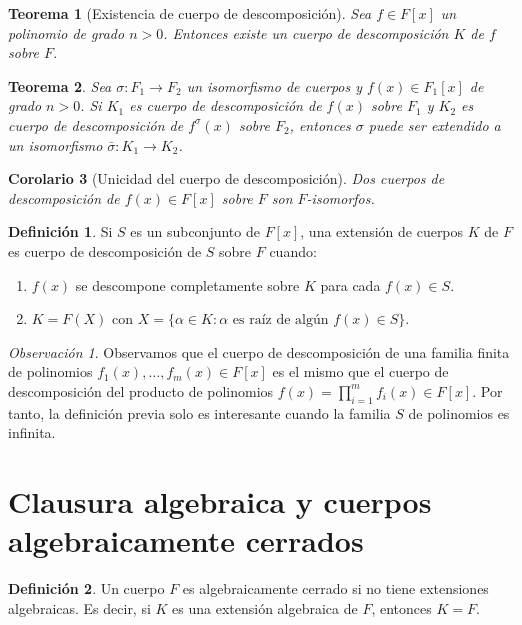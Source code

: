 \documentclass{report}
\newtheorem{theorem}{Teorema}[chapter]
\newtheorem{corollary}[theorem]{Corolario}
\theoremstyle{remark}
\newtheorem*{remark}{Observación}
\theoremstyle{definition}
\newtheorem{definition}{Definición}[chapter]
\theoremstyle{definition}
\theoremstyle{definition}
\begin{document}
\begin{theorem}[Existencia de cuerpo de descomposición]
    Sea $f \in F[x]$ un polinomio de grado $n > 0$.
    Entonces existe un cuerpo de descomposición $K$ de $f$ sobre $F$.
\end{theorem}

\begin{theorem}
    Sea $\sigma : F_1 \to F_2$ un isomorfismo de cuerpos y $f(x) \in F_1[x]$ de grado $n > 0$.
    Si $K_1$ es cuerpo de descomposición de $f(x)$ sobre $F_1$ y $K_2$ es cuerpo de descomposición de $f^\sigma(x)$ sobre $F_2$, entonces $\sigma$ puede ser extendido a un isomorfismo $\bar{\sigma} : K_1 \to K_2$.
\end{theorem}

\begin{corollary}[Unicidad del cuerpo de descomposición]
    Dos cuerpos de descomposición de $f(x) \in F[x]$ sobre $F$ son $F$-isomorfos.
\end{corollary}

\begin{definition}
    Si $S$ es un subconjunto de $F[x]$, una extensión de cuerpos $K$ de $F$ es cuerpo de descomposición de $S$ sobre $F$ cuando:
    \begin{enumerate}
        \item $f(x)$ se descompone completamente sobre $K$ para cada $f(x) \in S$.
        \item $K = F(X)$ con $X = \{ \alpha \in K : \alpha \text{ es raíz de algún } f(x) \in S \}$.
    \end{enumerate}
\end{definition}

\begin{remark}
    Observamos que el cuerpo de descomposición de una familia finita de polinomios $f_1(x), \dots, f_m(x) \in F[x]$ es el mismo que el cuerpo de descomposición del producto de polinomios $f(x) = \prod_{i = 1}^m f_i(x) \in F[x]$.
    Por tanto, la definición previa solo es interesante cuando la familia $S$ de polinomios es infinita.
\end{remark}

\section{Clausura algebraica y cuerpos algebraicamente cerrados}

\begin{definition}
    Un cuerpo $F$ es algebraicamente cerrado si no tiene extensiones algebraicas.
    Es decir, si $K$ es una extensión algebraica de $F$, entonces $K = F$.
\end{definition}
\end{document}
